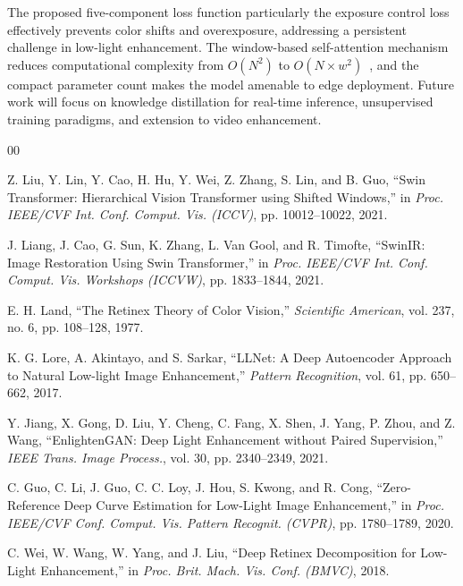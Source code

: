 \documentclass[conference]{IEEEtran}
\begin{document}
The proposed five-component loss function particularly the exposure control loss effectively prevents color shifts and overexposure, addressing a persistent challenge in low-light enhancement. The window-based self-attention mechanism reduces computational complexity from $O(N^2)$ to $O(N \times w^2)$~\cite{liu2021swin}, and the compact parameter count makes the model amenable to edge deployment. Future work will focus on knowledge distillation for real-time inference, unsupervised training paradigms, and extension to video enhancement.

\begin{thebibliography}{00}

Z. Liu, Y. Lin, Y. Cao, H. Hu, Y. Wei, Z. Zhang, S. Lin, and B. Guo, ``Swin Transformer: Hierarchical Vision Transformer using Shifted Windows,'' in \textit{Proc. IEEE/CVF Int. Conf. Comput. Vis. (ICCV)}, pp. 10012--10022, 2021.

J. Liang, J. Cao, G. Sun, K. Zhang, L. Van Gool, and R. Timofte, ``SwinIR: Image Restoration Using Swin Transformer,'' in \textit{Proc. IEEE/CVF Int. Conf. Comput. Vis. Workshops (ICCVW)}, pp. 1833--1844, 2021. 

E. H. Land, ``The Retinex Theory of Color Vision,'' \textit{Scientific American}, vol. 237, no. 6, pp. 108--128, 1977.

K. G. Lore, A. Akintayo, and S. Sarkar, ``LLNet: A Deep Autoencoder Approach to Natural Low-light Image Enhancement,'' \textit{Pattern Recognition}, vol. 61, pp. 650--662, 2017. 

Y. Jiang, X. Gong, D. Liu, Y. Cheng, C. Fang, X. Shen, J. Yang, P. Zhou, and Z. Wang, ``EnlightenGAN: Deep Light Enhancement without Paired Supervision,'' \textit{IEEE Trans. Image Process.}, vol. 30, pp. 2340--2349, 2021. 

C. Guo, C. Li, J. Guo, C. C. Loy, J. Hou, S. Kwong, and R. Cong, ``Zero-Reference Deep Curve Estimation for Low-Light Image Enhancement,'' in \textit{Proc. IEEE/CVF Conf. Comput. Vis. Pattern Recognit. (CVPR)}, pp. 1780--1789, 2020. 

C. Wei, W. Wang, W. Yang, and J. Liu, ``Deep Retinex Decomposition for Low-Light Enhancement,'' in \textit{Proc. Brit. Mach. Vis. Conf. (BMVC)}, 2018. 


\end{thebibliography}
\end{document}
